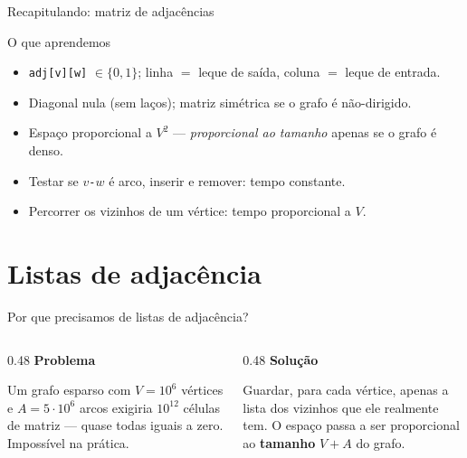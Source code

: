\documentclass[aspectratio=169]{beamer}
\begin{document}
\begin{frame}{Recapitulando: matriz de adjacências}
  \begin{block}{O que aprendemos}
    \begin{itemize}\small
      \item \texttt{adj[v][w]} $\in \{0,1\}$; linha $=$ leque de saída, coluna $=$ leque de entrada.
      \item Diagonal nula (sem laços); matriz simétrica se o grafo é não-dirigido.
      \item Espaço proporcional a $V^2$ --- \emph{proporcional ao tamanho} apenas se o grafo é denso.
      \item Testar se $v$\texttt{-}$w$ é arco, inserir e remover: tempo constante.
      \item Percorrer os vizinhos de um vértice: tempo proporcional a $V$.
    \end{itemize}
  \end{block}
\end{frame}

\section{Listas de adjacência}

\begin{frame}{Por que precisamos de listas de adjacência?}
  \begin{columns}[T]
    \begin{column}{0.48\textwidth}
      \textbf{Problema}

      \medskip
      {\small Um grafo esparso com $V = 10^6$ vértices e $A = 5 \cdot 10^6$ arcos
      exigiria $10^{12}$ células de matriz --- quase todas iguais a zero.
      Impossível na prática.}
    \end{column}
    \begin{column}{0.48\textwidth}
      \textbf{Solução}

      \medskip
      {\small Guardar, para cada vértice, apenas a lista dos vizinhos que ele
      realmente tem. O espaço passa a ser proporcional ao \textbf{tamanho}
      $V+A$ do grafo.}
    \end{column}
  \end{columns}
\end{frame}
\end{document}
